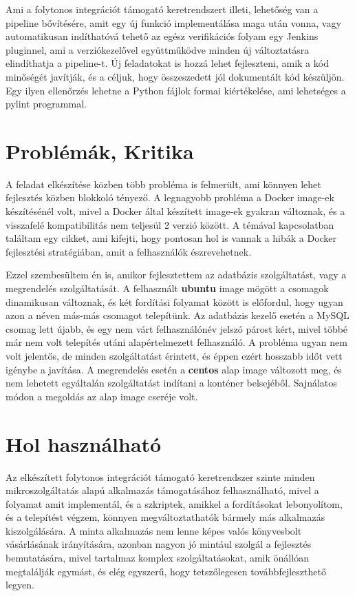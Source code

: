 \documentclass[11pt,magyar,a4paper,twoside,]{report}
\begin{document}
Ami a folytonos integrációt támogató keretrendszert illeti, lehetőség
van a pipeline bővítésére, amit egy új funkció implementálása maga után
vonna, vagy automatikusan indíthatóvá tehető az egész verifikációs
folyam egy Jenkins pluginnel, ami a verziókezelővel együttműködve minden
új változtatásra elindíthatja a pipeline-t. Új feladatokat is hozzá
lehet fejleszteni, amik a kód minőségét javítják, és a céljuk, hogy
összeszedett jól dokumentált kód készüljön. Egy ilyen ellenőrzés lehetne
a Python fájlok formai kiértékelése, ami lehetséges a pylint programmal.

\section{Problémák, Kritika}\label{probluxe9muxe1k-kritika}

A feladat elkészítése közben több probléma is felmerült, ami könnyen
lehet fejlesztés közben blokkoló tényező. A legnagyobb probléma a Docker
image-ek készítésénél volt, mivel a Docker által készített image-ek
gyakran változnak, és a visszafelé kompatibilitás nem teljesül 2 verzió
között. A témával kapcsolatban találtam egy cikket\citep{docker-is-bad},
ami kifejti, hogy pontosan hol is vannak a hibák a Docker fejlesztési
stratégiában, amit a felhasználók észrevehetnek.

Ezzel szembesültem én is, amikor fejlesztettem az adatbázis
szolgáltatást, vagy a megrendelés szolgáltatását. A felhasznált
\textbf{ubuntu} image mögött a csomagok dinamikusan változnak, és két
fordítási folyamat között is előfordul, hogy ugyan azon a néven más-más
csomagot telepítünk. Az adatbázis kezelő esetén a MySQL csomag lett
újabb, és egy nem várt felhasználónév jelszó párost kért, mivel többé
már nem volt telepítés utáni alapértelmezett felhasználó. A probléma
ugyan nem volt jelentős, de minden szolgáltatást érintett, és éppen
ezért hosszabb időt vett igénybe a javítása. A megrendelés esetén a
\textbf{centos} alap image változott meg, és nem lehetett egyáltalán
szolgáltatást indítani a konténer belsejéből. Sajnálatos módon a
megoldás az alap image cseréje volt.

\section{Hol használható}\label{hol-hasznuxe1lhatuxf3}

Az elkészített folytonos integrációt támogató keretrendszer szinte
minden mikroszolgáltatás alapú alkalmazás támogatásához felhasználható,
mivel a folyamat amit implementál, és a szkriptek, amikkel a
fordításokat lebonyolítom, és a telepítést végzem, könnyen
megváltoztathatók bármely más alkalmazás kiszolgálására. A minta
alkalmazás nem lenne képes valós könyvesbolt vásárlásának irányítására,
azonban nagyon jó mintául szolgál a fejlesztés bemutatására, mivel
tartalmaz komplex szolgáltatásokat, amik önállóan megtalálják egymást,
és elég egyszerű, hogy tetszőlegesen továbbfejleszthető legyen.
\end{document}
